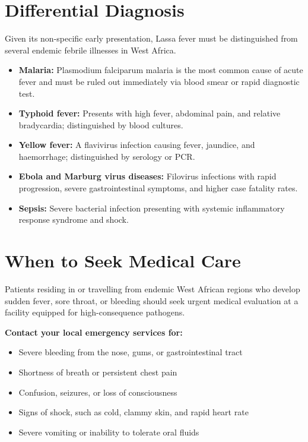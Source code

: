 \section*{Differential Diagnosis}
Given its non-specific early presentation, Lassa fever must be distinguished from several endemic febrile illnesses in West Africa.
\begin{itemize}
    \item \textbf{Malaria:} Plasmodium falciparum malaria is the most common cause of acute fever and must be ruled out immediately via blood smear or rapid diagnostic test.
    \item \textbf{Typhoid fever:} Presents with high fever, abdominal pain, and relative bradycardia; distinguished by blood cultures.
    \item \textbf{Yellow fever:} A flavivirus infection causing fever, jaundice, and haemorrhage; distinguished by serology or PCR.
    \item \textbf{Ebola and Marburg virus diseases:} Filovirus infections with rapid progression, severe gastrointestinal symptoms, and higher case fatality rates.
    \item \textbf{Sepsis:} Severe bacterial infection presenting with systemic inflammatory response syndrome and shock.
\end{itemize}

\section*{When to Seek Medical Care}
Patients residing in or travelling from endemic West African regions who develop sudden fever, sore throat, or bleeding should seek urgent medical evaluation at a facility equipped for high-consequence pathogens.

\textbf{Contact your local emergency services for:}
\begin{itemize}
    \item Severe bleeding from the nose, gums, or gastrointestinal tract
    \item Shortness of breath or persistent chest pain
    \item Confusion, seizures, or loss of consciousness
    \item Signs of shock, such as cold, clammy skin, and rapid heart rate
    \item Severe vomiting or inability to tolerate oral fluids
\end{itemize}

